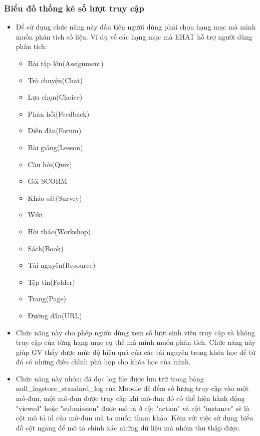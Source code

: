 \subsubsection{Biểu đồ thống kê số lượt truy cập}
\begin{itemize}
	\item Để sử dụng chức năng này đầu tiên người dùng phải chọn hạng mục mà mình muốn phân tích số liệu. Ví dụ về các hạng mục mà EHAT hỗ trợ người dùng phân tích:
	
	\begin{itemize}
		\item Bài tập lớn(Assignment)
		\item Trò chuyện(Chat)
		\item Lựa chọn(Choice)
		\item Phản hồi(Feedback)
		\item Diễn đàn(Forum)
		\item Bài giảng(Lesson)
		\item Câu hỏi(Quiz)
		\item Gói SCORM
		\item Khảo sát(Survey)
		\item Wiki
		\item Hội thảo(Workshop)
		\item Sách(Book)
		\item Tài nguyên(Resource)
		\item Tệp tin(Folder)
		\item Trang(Page)
		\item Đường dẫn(URL)
	\end{itemize}

	\item Chức năng này cho phép người dùng xem số lượt sinh viên truy cập và không truy cập của từng hạng mục cụ thể mà mình muốn phân tích. Chức năng này giúp GV thấy được mức độ hiệu quả của các tài nguyên trong khóa học để từ đó có những điều chình phù hợp cho khóa học của mình.
	
	\item Chức năng này nhóm đã đọc log file được lưu trữ trong bảng mdl\_logstore\_standard\_log của Moodle để đếm số lượng truy cập vào một mô-đun, một mô-đun được truy cập khi mô-đun đó có thể hiện hành động "viewed" hoặc "submission" được mô tả ở cột "action" và cột "instance" sẽ là cột mô tả id của mô-đun mà ta muốn tham khảo. Kèm với việc sử dụng biểu đồ cột ngang để mô tả chính xác những dữ liệu mà nhóm thu thập được.
\end{itemize}

